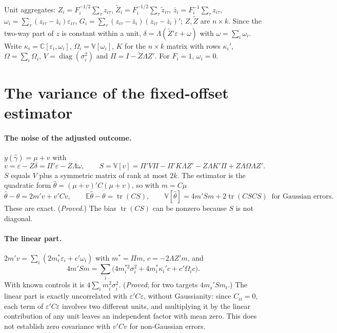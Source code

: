\documentclass[11pt]{article}
\newcommand{\E}{\mathbb{E}}
\newcommand{\Var}{\mathbb{V}}
\newcommand{\Cov}{\mathbb{C}}
\newcommand{\tr}{\operatorname{tr}}
\begin{document}
Unit aggregates: $Z_i=F_i^{-1/2}\sum_\tau z_{i\tau}$, $\tilde Z_i=F_i^{-1/2}\sum_\tau\tilde z_{i\tau}$,
$\bar z_i=F_i^{-1}\sum_\tau z_{i\tau}$, $\omega_i=\sum_\tau(z_{i\tau}-\bar z_i)\varepsilon_{i\tau}$,
$G_i=\sum_\tau(z_{i\tau}-\bar z_i)(z_{i\tau}-\bar z_i)'$; $Z,\tilde Z$ are $n\times k$. Since the two-way part of $z$
is constant within a unit, $\delta=\Lambda(\tilde Z'\varepsilon+\omega)$ with $\omega=\sum_i\omega_i$. Write
$\kappa_i=\Cov[\varepsilon_i,\omega_i]$, $\Omega_i=\Var[\omega_i]$, $K$ for the $n\times k$ matrix with rows $\kappa_i'$,
$\Omega=\sum_i\Omega_i$, $V=\operatorname{diag}(\sigma_i^2)$ and $\Pi=I-\tilde Z\Lambda Z'$. For $F_i=1$,
$\omega_i=0$.

\section{The variance of the fixed-offset estimator}
\paragraph{The noise of the adjusted outcome.} $y(\hat\gamma)=\mu+v$ with
\begin{equation}\label{eq:v}
 v=\varepsilon-Z\delta=\Pi'\varepsilon-Z\Lambda\omega,\qquad
 S=\Var[v]=\Pi'V\Pi-\Pi'K\Lambda Z'-Z\Lambda K'\Pi+Z\Lambda\Omega\Lambda Z'.
\end{equation}
$S$ equals $V$ plus a symmetric matrix of rank at most $2k$. The estimator is the quadratic form
$\hat\theta=(\mu+v)'C(\mu+v)$, so with $m=C\mu$
\begin{equation}\label{eq:exact}
 \hat\theta-\theta=2m'v+v'Cv,\qquad \E\hat\theta-\theta=\tr(CS),\qquad
 \Var[\hat\theta]=4m'Sm+2\tr(CSCS)\ \text{ for Gaussian errors.}
\end{equation}
These are exact. (\emph{Proved.}) The bias $\tr(CS)$ can be nonzero because $S$ is not diagonal.

\paragraph{The linear part.} $2m'v=\sum_i(2m_i^\ast\varepsilon_i+c'\omega_i)$ with $m^\ast=\Pi m$, $c=-2\Lambda Z'm$, and
\begin{equation}\label{eq:Vlin}
 4m'Sm=\sum_i\bigl(4m_i^{\ast2}\sigma_i^2+4m_i^\ast\kappa_i'c+c'\Omega_ic\bigr).
\end{equation}
With known controls it is $4\sum_im_i^2\sigma_i^2$. (\emph{Proved}; for two targets
$4m_s'Sm_t$.) The linear part is exactly uncorrelated with $\varepsilon'C\varepsilon$, without Gaussianity: since
$C_{ii}=0$, each term of $\varepsilon'C\varepsilon$ involves two different units, and multiplying it by the linear
contribution of any unit leaves an independent factor with mean zero. This does not establish zero covariance with
$v'Cv$ for non-Gaussian errors.
\end{document}
